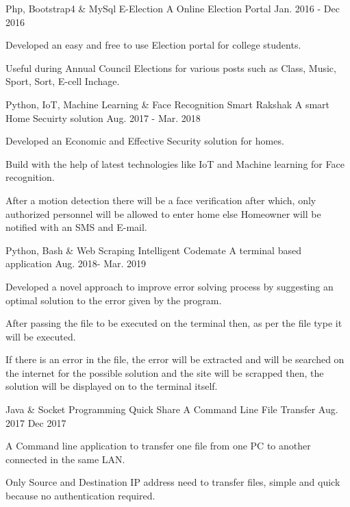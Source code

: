 \begin{cventries}
  \cventry
    {Php, Bootstrap4 \& MySql}
    {E-Election}
    {A Online Election Portal}
    {Jan. 2016 - Dec 2016}
    {
      \begin{cvitems}
        \item {Developed an easy and free to use Election portal for college students.}
        \item {Useful during Annual Council Elections for various posts such as Class, Music, Sport, Sort, E-cell Inchage.}
      \end{cvitems}
    }
  \cventry
    {Python, IoT, Machine Learning \& Face Recognition}
    {Smart Rakshak}
    {A smart Home Secuirty solution}
    {Aug. 2017 - Mar. 2018}
    {
      \begin{cvitems}
        \item {Developed an Economic and Effective Security solution for homes.}
        \item{Build with the help of latest technologies like IoT and Machine learning for Face recognition.}
        \item{After a motion detection there will be a face verification  after which, only authorized personnel will be allowed to enter home else Homeowner will be notified with an SMS and E-mail.}
      \end{cvitems}
    }
     \cventry
    {Python, Bash \& Web Scraping}
    {Intelligent Codemate}
    {A terminal based application}
    {Aug. 2018- Mar. 2019}
    {
      \begin{cvitems}
        \item {Developed a novel approach to improve error solving process by suggesting an optimal solution to the error given by the program.}
        \item{After passing the file to be executed on the terminal then, as per the file type it will be executed.}
        \item{If there is an error in the file, the error will be extracted and will be searched on the internet for the possible solution and the site will be scrapped then, the solution will be displayed on to the terminal itself.}
      \end{cvitems}
    }
     \cventry
    {Java \& Socket Programming}
    {Quick Share}
    {A Command Line File Transfer}
    {Aug. 2017  Dec 2017}
    {
      \begin{cvitems}
        \item {A Command line application to transfer one file from one PC to another connected in the same LAN.}
        \item{Only Source and Destination IP address need to transfer files, simple and quick because no authentication required.}
      \end{cvitems}
    }
    

\end{cventries}
